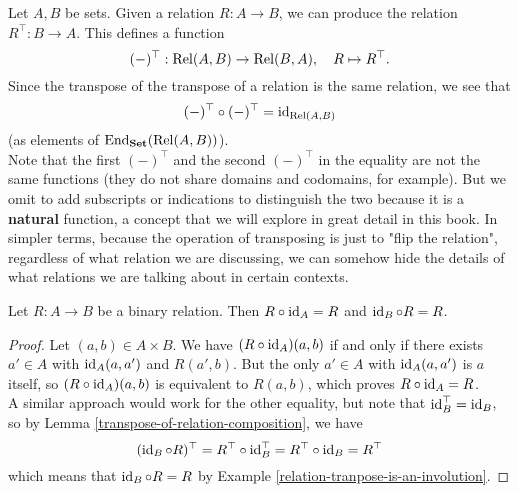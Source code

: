 \begin{example} \label{relation-tranpose-is-an-involution}
	Let $A,B$ be sets. Given a relation $R : A \to B$, we can produce the relation $R^{\top} : B \to A$. This defines a function
	\[
		(-)^{\top} : \mathrm{Rel}(A,B) \to \mathrm{Rel}(B,A), \quad R \mapsto R^{\top}.
	\]
	Since the transpose of the transpose of a relation is the same relation, we see that 
	\[
		(-)^{\top} \circ (-)^{\top} = \operatorname{\mathrm{id}}_{\mathrm{Rel}(A,B)}
	\]
	(as elements of $\operatorname{\mathrm{End}}_{\mathbf{Set}}(\mathrm{Rel}(A,B))$). 
	\\
	
	Note that the first $(-)^{\top}$ and the second $(-)^{\top}$ in the equality are not the same functions (they do not share domains and codomains, for example). But we omit to add subscripts or indications to distinguish the two because it is a \textbf{natural} function, a concept that we will explore in great detail in this book. In simpler terms, because the operation of transposing is just to "flip the relation", regardless of what relation we are discussing, we can somehow hide the details of what relations we are talking about in certain contexts. 
\end{example}

\begin{proposition} \label{the-identity-function-is-identity-for-relations}
	Let $R : A \to B$ be a binary relation. Then $R \circ \operatorname{\mathrm{id}}_{A} = R$ and $\operatorname{\mathrm{id}}_{B} \circ R = R$. 
\end{proposition}

\begin{proof}
	Let $(a,b) \in A \times B$. We have $(R \circ \operatorname{\mathrm{id}}_{A})(a,b)$ if and only if there exists $a' \in A$ with $\operatorname{\mathrm{id}}_{A}(a,a')$ and $R(a',b)$. But the only $a' \in A$ with $\operatorname{\mathrm{id}}_{A}(a, a')$ is $a$ itself, so $(R \circ \operatorname{\mathrm{id}}_{A})(a,b)$ is equivalent to $R(a,b)$, which proves $R \circ \operatorname{\mathrm{id}}_{A} = R$.
	\\
	
	A similar approach would work for the other equality, but note that $\operatorname{\mathrm{id}}_{B}^{\top} = \operatorname{\mathrm{id}}_{B}$, so by Lemma \autoref{transpose-of-relation-composition}, we have
	\[
		(\operatorname{\mathrm{id}}_{B} \circ R)^{\top} = R^{\top} \circ \operatorname{\mathrm{id}}_{B}^{\top} = R^{\top} \circ \operatorname{\mathrm{id}}_{B} = R^{\top}
	\]
	which means that $\operatorname{\mathrm{id}}_{B} \circ R = R$ by Example \autoref{relation-tranpose-is-an-involution}. 
\end{proof}

